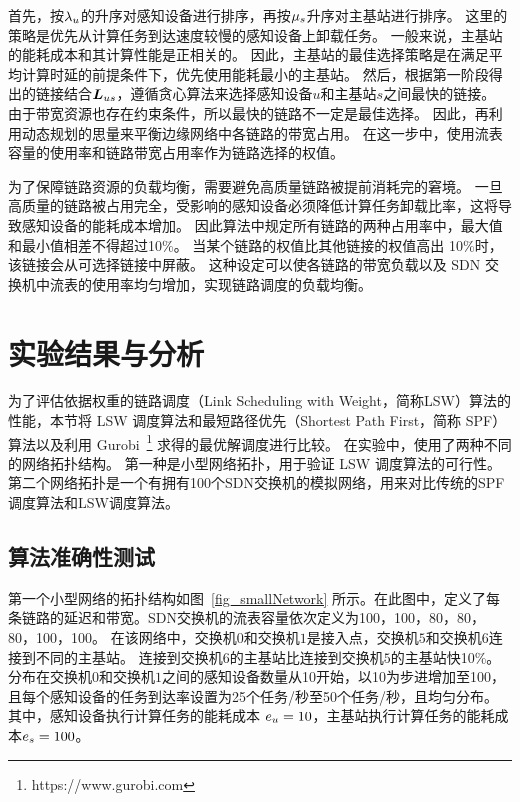 首先，按${\lambda}_{u}$的升序对感知设备进行排序，再按${\mu}_{s}$升序对主基站进行排序。
这里的策略是优先从计算任务到达速度较慢的感知设备上卸载任务。
一般来说，主基站的能耗成本和其计算性能是正相关的。
因此，主基站的最佳选择策略是在满足平均计算时延的前提条件下，优先使用能耗最小的主基站。
然后，根据第一阶段得出的链接结合$\boldsymbol{L}_{us}$，遵循贪心算法来选择感知设备$u$和主基站$s$之间最快的链接。 
由于带宽资源也存在约束条件，所以最快的链路不一定是最佳选择。
因此，再利用动态规划的思量来平衡边缘网络中各链路的带宽占用。
在这一步中，使用流表容量的使用率和链路带宽占用率作为链路选择的权值。

为了保障链路资源的负载均衡，需要避免高质量链路被提前消耗完的窘境。
一旦高质量的链路被占用完全，受影响的感知设备必须降低计算任务卸载比率，这将导致感知设备的能耗成本增加。
因此算法中规定所有链路的两种占用率中，最大值和最小值相差不得超过10\%。
当某个链路的权值比其他链接的权值高出 10\%时，该链接会从可选择链接中屏蔽。
这种设定可以使各链路的带宽负载以及 SDN 交换机中流表的使用率均匀增加，实现链路调度的负载均衡。




\section{实验结果与分析}

为了评估依据权重的链路调度（Link Scheduling with Weight，简称LSW）算法的性能，本节将 LSW 调度算法和最短路径优先（Shortest Path First，简称 SPF）算法以及利用 Gurobi~\footnote{https://www.gurobi.com} 求得的最优解调度进行比较。
在实验中，使用了两种不同的网络拓扑结构。
第一种是小型网络拓扑，用于验证 LSW 调度算法的可行性。
第二个网络拓扑是一个有拥有100个SDN交换机的模拟网络，用来对比传统的SPF调度算法和LSW调度算法。

\subsection{算法准确性测试}

第一个小型网络的拓扑结构如图~\ref{fig_smallNetwork} 所示。在此图中，定义了每条链路的延迟和带宽。SDN交换机的流表容量依次定义为100，100，80，80，80，100，100。
在该网络中，交换机$0$和交换机$1$是接入点，交换机$5$和交换机$6$连接到不同的主基站。
连接到交换机$6$的主基站比连接到交换机$5$的主基站快10\%。
分布在交换机$0$和交换机$1$之间的感知设备数量从10开始，以10为步进增加至100，且每个感知设备的任务到达率设置为25个任务/秒至50个任务/秒，且均匀分布。
其中，感知设备执行计算任务的能耗成本 $e_u=10$，主基站执行计算任务的能耗成本$e_s=100$。


